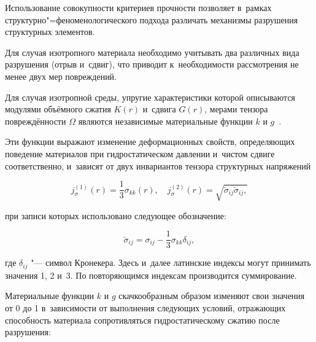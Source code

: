 Использование совокупности критериев прочности позволяет в~рамках структурно"=феноменологического подхода различать механизмы разрушения структурных элементов. 

Для случая изотропного материала необходимо учитывать два различных вида разрушения (отрыв и~сдвиг), что  приводит к~необходимости рассмотрения не менее двух мер повреждений.



Для случая изотропной среды, упругие характеристики которой описываются  модулями объёмного сжатия $K(r)$ и~сдвига $G(r)$, мерами тензора повреждённости $\Omega$ являются независимые материальные функции $k$ и $g$~\cite{Ilinykh:bib:Wildeman}. 

Эти функции выражают изменение деформационных свойств, определяющих поведение материалов при гидростатическом давлении и~чистом сдвиге соответственно, и~зависят от двух инвариантов тензора структурных напряжений

\begin{equation*}

j^{(1)}_{\sigma} (r)= \frac{1}{3} \sigma_{kk} (r), \quad j_{\sigma }^{(2)} (r) = \sqrt {\breve{{\sigma}}_{ij} \breve{{\sigma}}_{ij},}

\end{equation*}

при записи которых использовано следующее обозначение:

\begin{equation*}

\breve{{\sigma}}_{ij} = \sigma_{ij} - \frac{1}{3}\sigma_{kk} \delta_{ij},

\end{equation*}

где $\delta_{ij}$ "--- символ Кронекера. Здесь и~далее латинские индексы могут принимать значения 1, 2 и~3. По повторяющимся индексам производится суммирование.



Материальные функции $k$ и $g$ скачкообразным образом изменяют свои значения от 0 до 1 в~зависимости от выполнения следующих условий, отражающих способность материала сопротивляться гидростатическому сжатию после разрушения:

